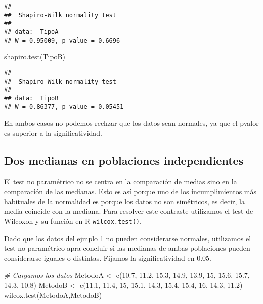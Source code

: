 \documentclass[
]{book}
\newenvironment{Shaded}{\begin{snugshade}}{\end{snugshade}}
\newcommand{\CommentTok}[1]{\textcolor[rgb]{0.56,0.35,0.01}{\textit{#1}}}
\newcommand{\DecValTok}[1]{\textcolor[rgb]{0.00,0.00,0.81}{#1}}
\newcommand{\FloatTok}[1]{\textcolor[rgb]{0.00,0.00,0.81}{#1}}
\newcommand{\FunctionTok}[1]{\textcolor[rgb]{0.00,0.00,0.00}{#1}}
\newcommand{\NormalTok}[1]{#1}
\newcommand{\OtherTok}[1]{\textcolor[rgb]{0.56,0.35,0.01}{#1}}
\begin{document}
\begin{verbatim}
## 
##  Shapiro-Wilk normality test
## 
## data:  TipoA
## W = 0.95009, p-value = 0.6696
\end{verbatim}

\begin{Shaded}
\begin{Highlighting}[]
\FunctionTok{shapiro.test}\NormalTok{(TipoB)}
\end{Highlighting}
\end{Shaded}

\begin{verbatim}
## 
##  Shapiro-Wilk normality test
## 
## data:  TipoB
## W = 0.86377, p-value = 0.05451
\end{verbatim}

En ambos casos no podemos rechzar que los datos sean normales, ya que el pvalor es superior a la significatividad.

\hypertarget{dos-medianas-en-poblaciones-independientes}{%
\subsection{Dos medianas en poblaciones independientes}\label{dos-medianas-en-poblaciones-independientes}}

El test no paramétrico no se centra en la comparación de medias sino en la comparación de las medianas. Esto es así porque uno de los incumplimientos más habituales de la normalidad es porque los datos no son simétricos, es decir, la media coincide con la mediana. Para resolver este contraste utilizamos el test de Wilcoxon y su función en R \texttt{wilcox.test()}.

Dado que los datos del ejmplo 1 no pueden considerarse normales, utilizamos el test no paramétrico apra concluir si las medianas de ambas poblaciones pueden considerarse iguales o distintas. Fijamos la significatividad en 0.05.

\begin{Shaded}
\begin{Highlighting}[]
\CommentTok{\# Cargamos los datos}
\NormalTok{MetodoA }\OtherTok{\textless{}{-}} \FunctionTok{c}\NormalTok{(}\FloatTok{10.7}\NormalTok{, }\FloatTok{11.2}\NormalTok{, }\FloatTok{15.3}\NormalTok{, }\FloatTok{14.9}\NormalTok{, }\FloatTok{13.9}\NormalTok{, }\DecValTok{15}\NormalTok{, }\FloatTok{15.6}\NormalTok{, }\FloatTok{15.7}\NormalTok{, }\FloatTok{14.3}\NormalTok{, }\FloatTok{10.8}\NormalTok{)}
\NormalTok{MetodoB }\OtherTok{\textless{}{-}} \FunctionTok{c}\NormalTok{(}\FloatTok{11.1}\NormalTok{, }\FloatTok{11.4}\NormalTok{, }\DecValTok{15}\NormalTok{, }\FloatTok{15.1}\NormalTok{, }\FloatTok{14.3}\NormalTok{, }\FloatTok{15.4}\NormalTok{, }\FloatTok{15.4}\NormalTok{, }\DecValTok{16}\NormalTok{, }\FloatTok{14.3}\NormalTok{, }\FloatTok{11.2}\NormalTok{)}
\FunctionTok{wilcox.test}\NormalTok{(MetodoA,MetodoB)}
\end{Highlighting}
\end{Shaded}
\end{document}
